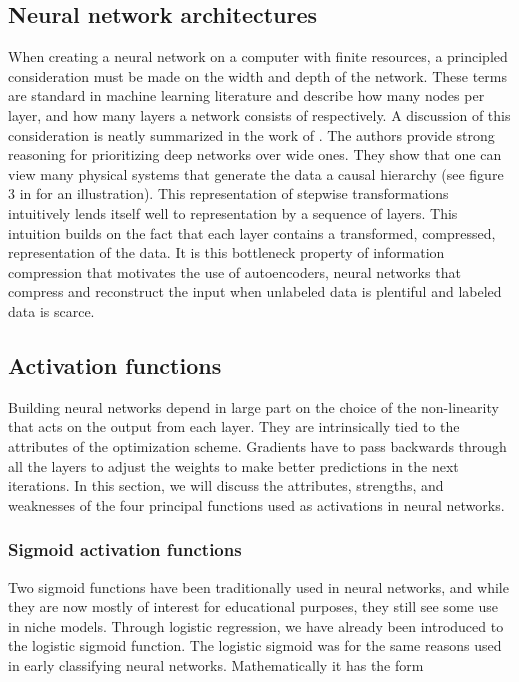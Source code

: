 \subsection{Neural network architectures}

When creating a neural network on a computer with finite resources, a principled consideration must be made on the width and depth of the network. These terms are standard in machine learning literature and describe how many nodes per layer, and how many layers a network consists of respectively. A discussion of this consideration is neatly summarized in the work of \citet{Lin2017}. The authors provide strong reasoning for prioritizing deep networks over wide ones. They show that one can view many physical systems that generate the data a causal hierarchy (see figure 3 in \citet{Lin2017} for an illustration). This representation of stepwise transformations intuitively lends itself well to representation by a sequence of layers. This intuition builds on the fact that each layer contains a transformed, compressed, representation of the data. It is this bottleneck property of information compression that motivates the use of autoencoders, neural networks that compress and reconstruct the input when unlabeled data is plentiful and labeled data is scarce.

\subsection{Activation functions}\label{sec:activation}

Building neural networks depend in large part on the choice of the non-linearity that acts on the output from each layer. They are intrinsically tied to the attributes of the optimization scheme. Gradients have to pass backwards through all the layers to adjust the weights to make better predictions in the next iterations. In this section, we will discuss the attributes, strengths, and weaknesses of the four principal functions used as activations in neural networks. 

\subsubsection{Sigmoid activation functions}

Two sigmoid functions have been traditionally used in neural networks, and while they are now mostly of interest for educational purposes, they still see some use in niche models. Through logistic regression, we have already been introduced to the logistic sigmoid function. The logistic sigmoid was for the same reasons used in early classifying neural networks. Mathematically it has the form 

